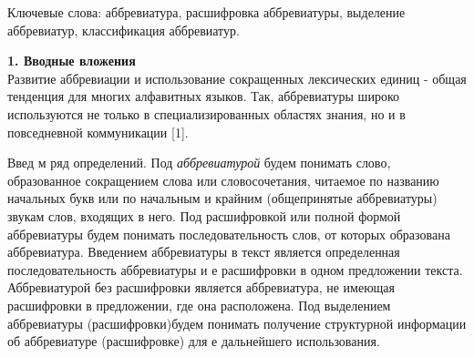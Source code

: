 \documentclass[a4paper]{article}
\begin{document}
\renewcommand{\refname}{\centering \textnormal {\bf ЛИТЕРАТУРА}}
\renewcommand{\figurename}{Рисунок}

\begin{center}

\end{center}

\begin{muquotation}
\small Ключевые слова: аббревиатура, расшифровка аббревиатуры, выделение аббревиатур, классификация аббревиатур.
\end{muquotation}




\quad\textbf{1. Вводные вложения}\\
Развитие аббревиации и использование сокращенных лексических единиц - общая тенденция для многих алфавитных языков. Так, аббревиатуры широко используются не только в специализированных областях знания, но и в повседневной коммуникации [1].

Введ м ряд определений. Под \textit{аббревиатурой} будем понимать слово, образованное сокращением слова или словосочетания, читаемое по названию начальных букв или по начальным и крайним (общепринятые аббревиатуры) звукам слов, входящих в него. Под расшифровкой или полной формой аббревиатуры будем понимать последовательность слов, от которых образована аббревиатура. Введением аббревиатуры в текст является определенная последовательность аббревиатуры и е расшифровки в одном предложении текста. Аббревиатурой без расшифровки является аббревиатура, не имеющая расшифровки в предложении, где она расположена. Под выделением аббревиатуры (расшифровки)будем понимать получение структурной информации об аббревиатуре (расшифровке) для е дальнейшего использования.
\end{document}
